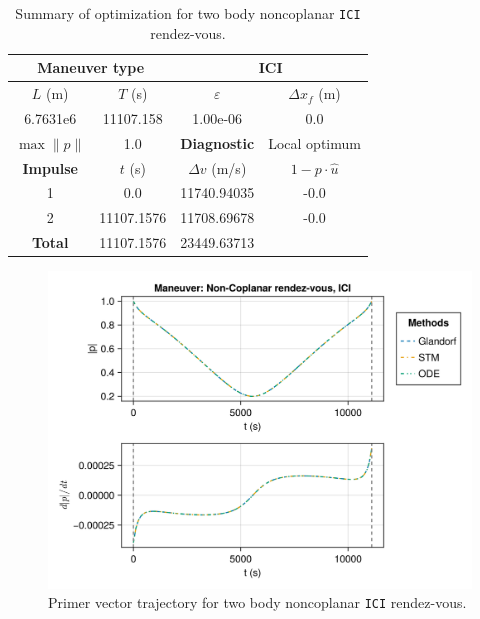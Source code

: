 \begin{table}[htpb]
    \centering
    \begin{tabular}{cccc} \toprule
    \multicolumn{2}{c}{\textbf{Maneuver type}} & \multicolumn{2}{c}{ICI} \\ \midrule
    \(L\) (m) & \(T\) (s) & \(\varepsilon\) & \(\Delta x_{f}\) (m)    \\ \midrule
    6.7631e6          & 11107.158          & 1.00e-06                & 0.0                        \\ \midrule
    \(\max \lVert p \rVert\) & 1.0     & \textbf{Diagnostic}   & Local optimum        \\ \midrule
    \textbf{Impulse} & \(t\) (s) & \(\Delta v\) (m/s) & \(1 - p \cdot \hat{u}\) \\ \midrule
    1                 & 0.0          & 11740.94035             & -0.0                    \\
    2                 & 11107.1576          & 11708.69678             & -0.0                    \\\midrule
    \textbf{Total}   & 11107.1576          & 23449.63713             &                     \\ \bottomrule   
    \end{tabular}
    \caption{Summary of optimization for two body noncoplanar \texttt{ICI} rendez-vous.}
    \label{tab:tb_ncop_ICI_tab}
\end{table}

\begin{figure}[htbp]
    \centering
    \includegraphics[width=\linewidth]{../results/two_body/ipv_noncop/ICI_primer_vector.png}
    \caption{Primer vector trajectory for two body noncoplanar \texttt{ICI} rendez-vous.}
    \label{fig:tb_ncop_ICI_pv}
\end{figure}

